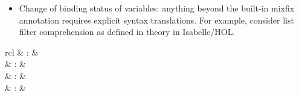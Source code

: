 \begin{isabellebody}
\begin{isamarkuptext}
\begin{itemize}
  \item Change of binding status of variables: anything beyond the
  built-in \hyperlink{keyword.binder}{\mbox{}} mixfix annotation requires explicit
  syntax translations.  For example, consider list filter
  comprehension  as defined in theory \hyperlink{theory.List}{\mbox{}} in Isabelle/HOL.

  \end{itemize}%
\end{isamarkuptext}%
\isamarkuptrue%
%
\isamarkuptrue%
%
\begin{isamarkuptext}%
\begin{matharray}{rcl}
    \hypertarget{command.parse-ast-translation}{\hyperlink{command.parse-ast-translation}{\mbox{}}} & : &  \\
    \hypertarget{command.parse-translation}{\hyperlink{command.parse-translation}{\mbox{}}} & : &  \\
    \hypertarget{command.print-translation}{\hyperlink{command.print-translation}{\mbox{}}} & : &  \\
    \hypertarget{command.typed-print-translation}{\hyperlink{command.typed-print-translation}{\mbox{}}} & : &  \\

\end{matharray}
\end{isamarkuptext}
\end{isabellebody}
